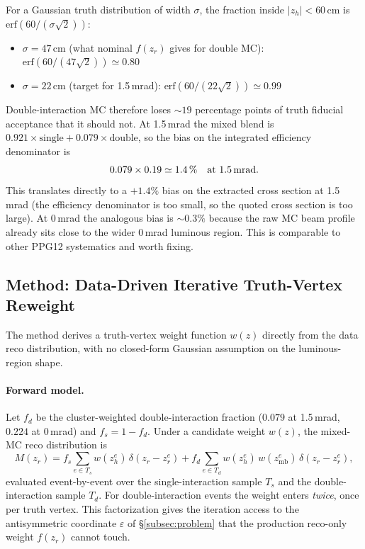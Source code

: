 \documentclass[11pt,a4paper]{article}
\begin{document}
For a Gaussian truth distribution of width $\sigma$, the fraction
inside $|z_h|<60$\,cm is $\mathrm{erf}(60/(\sigma\sqrt 2))$:
\begin{itemize}\setlength\itemsep{1pt}
\item $\sigma = 47$\,cm (what nominal $f(z_r)$ gives for double MC):
      $\mathrm{erf}(60/(47\sqrt 2)) \simeq 0.80$
\item $\sigma = 22$\,cm (target for 1.5\,mrad):
      $\mathrm{erf}(60/(22\sqrt 2)) \simeq 0.99$
\end{itemize}
Double-interaction MC therefore loses $\sim\!19$ percentage points
of truth fiducial acceptance that it should not. At 1.5\,mrad the
mixed blend is
$0.921 \times \text{single} + 0.079 \times \text{double}$, so the
bias on the integrated efficiency denominator is
\[
0.079 \times 0.19 \simeq 1.4\,\% \quad \text{at 1.5\,mrad}.
\]
This translates directly to a $+1.4\%$ bias on the extracted cross
section at 1.5\,mrad (the efficiency denominator is too small, so
the quoted cross section is too large). At 0\,mrad the analogous
bias is $\sim\!0.3\%$ because the raw MC beam profile already sits
close to the wider 0\,mrad luminous region. This is comparable to
other PPG12 systematics and worth fixing.

\subsection{Method: Data-Driven Iterative Truth-Vertex Reweight}
\label{subsec:method}

The method derives a truth-vertex weight function $w(z)$ directly
from the data reco distribution, with no closed-form Gaussian
assumption on the luminous-region shape.

\paragraph{Forward model.}
Let $f_d$ be the cluster-weighted double-interaction fraction
($0.079$ at 1.5\,mrad, $0.224$ at 0\,mrad) and
$f_s = 1-f_d$. Under a candidate weight $w(z)$, the mixed-MC reco
distribution is
\begin{equation}
M(z_r) =
f_s \!\!\sum_{e \in T_s}\! w(z_h^{e})\,\delta(z_r - z_r^e)
+
f_d \!\!\sum_{e \in T_d}\! w(z_h^{e})\,w(z_\mathrm{mb}^{e})\,\delta(z_r - z_r^e),
\label{eq:iter_forward}
\end{equation}
evaluated event-by-event over the single-interaction sample $T_s$
and the double-interaction sample $T_d$. For double-interaction
events the weight enters \emph{twice}, once per truth vertex. This
factorization gives the iteration access to the antisymmetric
coordinate $\varepsilon$ of \S\ref{subsec:problem} that the
production reco-only weight $f(z_r)$ cannot touch.
\end{document}
